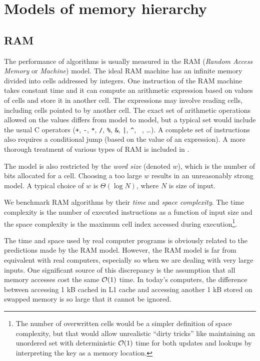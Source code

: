\chapter{Models of memory hierarchy}
\label{chapter:models}
\section{RAM}

The performance of algorithms is usually measured in the RAM
(\emph{Random Access Memory} or \emph{Machine}) model.
The ideal RAM machine has an infinite memory divided into cells addressed
by integers.
One instruction of the RAM machine takes constant time and it
can compute an arithmetic expression based on values of cells and store it
in another cell. The expressions may involve reading cells, including cells
pointed to by another cell. The exact set of arithmetic operations allowed
on the values differs from model to model, but a typical set would include
the usual C operators (\texttt{+}, \texttt{-}, \texttt{*}, \texttt{/},
\texttt{\%}, \texttt{\&}, \texttt{|}, \texttt{\^}, \texttt{~}, \dots).
A complete set of instructions also requires a conditional jump (based on
the value of an expression).
A more thorough treatment of various types of RAM is included
in \cite{saga-of-msts}.

The model is also restricted by the \textit{word size} (denoted $w$),
which is the number of bits allocated for a cell. Choosing a too large $w$
results in an unreasonably strong model. A typical choice of $w$ is
$\Theta(\log N)$, where $N$ is size of input.

We benchmark RAM algorithms by their \emph{time} and \emph{space complexity}.
The time complexity is the number of executed instructions as a function of
input size and the space complexity is the maximum cell index accessed during
execution\footnote{
	The number of overwritten cells would be a simpler definition
	of space complexity, but that would allow unrealistic ``dirty tricks''
	like maintaining an unordered set with deterministic $\mathcal{O}(1)$ time
	for both updates and lookups by interpreting the key as a memory
	location.
}.

The time and space used by real computer programs is obviously related
to the predictions made by the RAM model. However, the RAM model is far
from equivalent with real computers, especially so when we are dealing with
very large inputs. One significant source of this discrepancy is the assumption
that all memory accesses cost the same $\mathcal{O}(1)$ time. In today's computers,
the difference between accessing 1 kB cached in L1 cache and accessing
another 1 kB stored on swapped memory is so large that it cannot be ignored.

